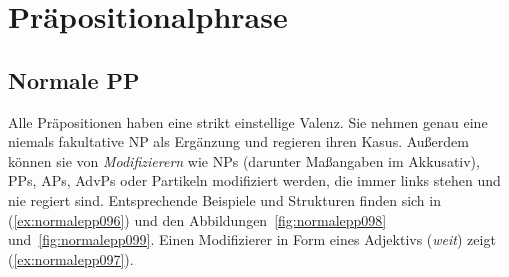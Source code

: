 \Np


\Np

\section{Präpositionalphrase}
\label{sec:praepositionalphrase}

\subsection{Normale PP}
\label{sec:normalepp}


\vspace{2\baselineskip} %


Alle Präpositionen haben eine strikt einstellige Valenz.
Sie nehmen genau eine niemals fakultative NP als Ergänzung und regieren ihren Kasus.
Außerdem können sie von \textit{Modifizierern} wie NPs (darunter Maßangaben im Akkusativ), PPs, APs, AdvPs oder Partikeln modifiziert werden, die immer links stehen und nie regiert sind.
Entsprechende Beispiele und Strukturen finden sich in (\ref{ex:normalepp096}) und den Abbildungen~\ref{fig:normalepp098} und~\ref{fig:normalepp099}.
Einen Modifizierer in Form eines Adjektivs (\textit{weit}) zeigt (\ref{ex:normalepp097}).

\begin{exe}
  \ex\label{ex:normalepp096}
  \begin{xlist}
  \end{xlist}
\end{exe}


